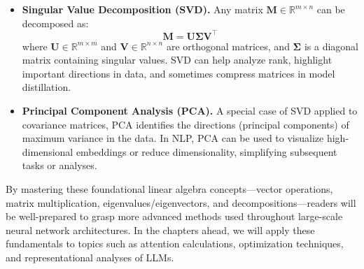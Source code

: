 \begin{itemize}
    \item \textbf{Singular Value Decomposition (SVD).}
    Any matrix $\mathbf{M} \in \mathbb{R}^{m \times n}$ can be decomposed as:
    \begin{equation}\label{eq:svd}
    \mathbf{M} = \mathbf{U} \boldsymbol{\Sigma} \mathbf{V}^\top
    \end{equation}
    where $\mathbf{U} \in \mathbb{R}^{m \times m}$ and $\mathbf{V} \in \mathbb{R}^{n \times n}$ are orthogonal matrices, and $\boldsymbol{\Sigma}$ is a diagonal matrix containing singular values. SVD can help analyze rank, highlight important directions in data, and sometimes compress matrices in model distillation.

    \item \textbf{Principal Component Analysis (PCA).}
    A special case of SVD applied to covariance matrices, PCA identifies the directions (principal components) of maximum variance in the data. In NLP, PCA can be used to visualize high-dimensional embeddings or reduce dimensionality, simplifying subsequent tasks or analyses.
\end{itemize}

\noindent
By mastering these foundational linear algebra concepts—vector operations, matrix multiplication, eigenvalues/eigenvectors, and decompositions—readers will be well-prepared to grasp more advanced methods used throughout large-scale neural network architectures. In the chapters ahead, we will apply these fundamentals to topics such as attention calculations, optimization techniques, and representational analyses of LLMs. 
